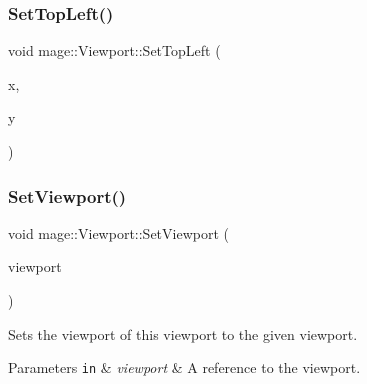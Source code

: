 \hypertarget{classmage_1_1_viewport_a982a30c583445f04516cfae876667e62}{}\label{classmage_1_1_viewport_a982a30c583445f04516cfae876667e62} 
\subsubsection{\texorpdfstring{Set\+Top\+Left()}{SetTopLeft()}\hspace{0.1cm}{\footnotesize\ttfamily [2/2]}}
{\footnotesize\ttfamily void mage\+::\+Viewport\+::\+Set\+Top\+Left (\begin{DoxyParamCaption}\item[{\hyperlink{namespacemage_aa97e833b45f06d60a0a9c4fc22ae02c0}{F32}}]{x,  }\item[{\hyperlink{namespacemage_aa97e833b45f06d60a0a9c4fc22ae02c0}{F32}}]{y }\end{DoxyParamCaption})\hspace{0.3cm}{\ttfamily [noexcept]}}

\hypertarget{classmage_1_1_viewport_a12a0d7b74ce81786e38f08d399acafc6}{}\label{classmage_1_1_viewport_a12a0d7b74ce81786e38f08d399acafc6} 
\subsubsection{\texorpdfstring{Set\+Viewport()}{SetViewport()}\hspace{0.1cm}{\footnotesize\ttfamily [1/2]}}
{\footnotesize\ttfamily void mage\+::\+Viewport\+::\+Set\+Viewport (\begin{DoxyParamCaption}\item[{const D3\+D11\+\_\+\+V\+I\+E\+W\+P\+O\+RT \&}]{viewport }\end{DoxyParamCaption})\hspace{0.3cm}{\ttfamily [noexcept]}}

Sets the viewport of this viewport to the given viewport.


\begin{DoxyParams}[1]{Parameters}
\mbox{\tt in}  & {\em viewport} & A reference to the viewport. \\
\hline
\end{DoxyParams}
\hypertarget{classmage_1_1_viewport_a12c41f937452bb1897558f0126947b22}{}\label{classmage_1_1_viewport_a12c41f937452bb1897558f0126947b22} 
